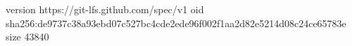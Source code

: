 version https://git-lfs.github.com/spec/v1
oid sha256:de9737c38a93ebd07c527bc4cde2ede96f002f1aa2d82e5214d08c24ce65783e
size 43840
